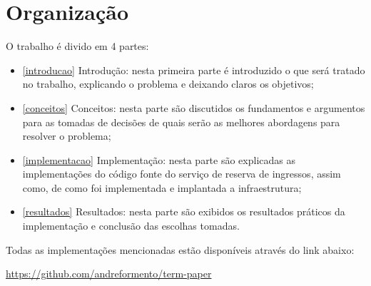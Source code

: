 \section{Organização}

O trabalho é divido em 4 partes:

\begin{itemize}
    \item \autoref{introducao} Introdução: nesta primeira parte é introduzido o que
          será tratado no trabalho, explicando o problema e deixando claros os objetivos;

    \item \autoref{conceitos} Conceitos: nesta parte são discutidos os fundamentos e
          argumentos para as tomadas de decisões de quais serão as melhores
          abordagens para resolver o problema;

    \item \autoref{implementacao} Implementação: nesta parte são explicadas as
          implementações do código fonte do serviço de reserva de ingressos, assim
          como, de como foi implementada e implantada a infraestrutura;

    \item \autoref{resultados} Resultados: nesta parte são exibidos os resultados
          práticos da implementação e conclusão das escolhas tomadas.

\end{itemize}

Todas as implementações mencionadas estão disponíveis através do link abaixo:

\url{https://github.com/andreformento/term-paper}
